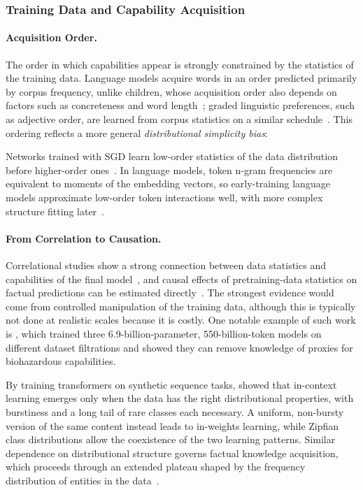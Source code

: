 \subsubsection{Training Data and Capability Acquisition}
\label{sec:ld-data}

\paragraph{Acquisition Order.} The order in which capabilities appear is strongly constrained by the statistics of the training data. Language models acquire words in an order predicted primarily by corpus frequency, unlike children, whose acquisition order also depends on factors such as concreteness and word length~; graded linguistic preferences, such as adjective order, are learned from corpus statistics on a similar schedule~. This ordering reflects a more general \emph{distributional simplicity bias}:

\begin{definitionbox}
Networks trained with SGD learn low-order statistics of the data distribution before higher-order ones~. In language models, token n-gram frequencies are equivalent to moments of the embedding vectors, so early-training language models approximate low-order token interactions well, with more complex structure fitting later~.
\end{definitionbox}

\paragraph{From Correlation to Causation.} Correlational studies show a strong connection between data statistics and capabilities of the final model~, and causal effects of pretraining-data statistics on factual predictions can be estimated directly~. The strongest evidence would come from controlled manipulation of the training data, although this is typically not done at realistic scales because it is costly. One notable example of such work is , which trained three 6.9-billion-parameter, 550-billion-token models on different dataset filtrations and showed they can remove knowledge of proxies for biohazardous capabilities.

By training transformers on synthetic sequence tasks,  showed that in-context learning emerges only when the data has the right distributional properties, with burstiness and a long tail of rare classes each necessary. A uniform, non-bursty version of the same content instead leads to in-weights learning, while Zipfian class distributions allow the coexistence of the two learning patterns. Similar dependence on distributional structure governs factual knowledge acquisition, which proceeds through an extended plateau shaped by the frequency distribution of entities in the data~.

